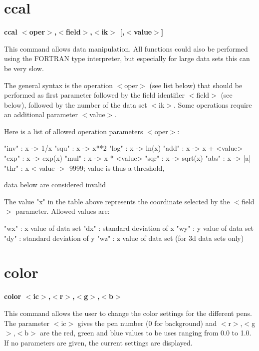 \section{ccal}
{\bf ccal $ <$oper$> $,$ <$field$> $,$ <$ik$> $ [,$ <$value$> $] \par }
\par
\vspace{3pt}
This command allows data manipulation. All functions could also 
be performed using the FORTRAN type interpreter, but especially 
for large data sets this can be very slow. 
\par
The general syntax is the operation $ <$oper$> $ (see list below) that 
should be performed as first parameter followed by the field 
identifier $ <$field$> $ (see below), followed by the number of the 
data set $ <$ik$> $. Some operations require an additional parameter 
$ <$value$> $. 
\par
Here is a list of allowed operation parameters $ <$oper$> $: 
\par
\begin{MacVerbatim}
  "inv"  :  x -> 1/x         "squ"  :  x -> x**2
  "log"  :  x -> ln(x)       "add"  :  x -> x + <value>
  "exp"  :  x -> exp(x)      "mul"  :  x -> x * <value>
  "sqr"  :  x -> sqrt(x)     "abs"  :  x -> |a|
  "thr"  :  x < value -> -9999; value is thus a threshold,
\end{MacVerbatim}
 data below are considered invalid 
\par
The value "x" in the table above represents the coordinate selected 
by the $ <$field$> $ parameter. Allowed values are: 
\par
\begin{MacVerbatim}
  "wx" : x value of data set
  "dx" : standard deviation of x
  "wy" : y value of data set
  "dy" : standard deviation of y
  "wz" : z value of data set (for 3d data sets only)
\end{MacVerbatim}
\section{color}
{\bf color $ <$ic$> $,$ <$r$> $,$ <$g$> $,$ <$b$> $ \par }
\par
\vspace{3pt}
This command allows the user to change the color settings for 
the different pens. The parameter $ <$ic$> $ gives the pen number 
(0 for background) and $ <$r$> $,$ <$g$> $,$ <$b$> $ are the red, green and blue 
values to be uses ranging from 0.0 to 1.0. If no parameters are 
given, the current settings are displayed. 
